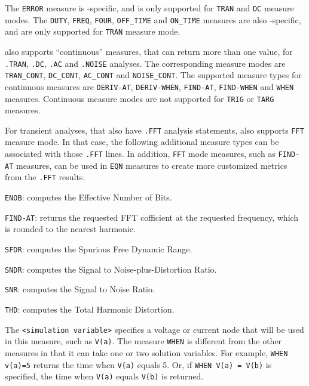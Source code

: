 The \texttt{ERROR} measure is \Xyce{}-specific, and is only supported for \texttt{TRAN} and
\texttt{DC} measure modes.  The \texttt{DUTY}, \texttt{FREQ}, \texttt{FOUR}, \texttt{OFF\_TIME}
and \texttt{ON\_TIME} measures are also \Xyce{}-specific, and are  only supported for
\texttt{TRAN} measure mode.

\Xyce{} also supports ``continuous'' measures, that can return more than one value, for
\texttt{.TRAN}, \texttt{.DC}, \texttt{.AC} and \texttt{.NOISE} analyses.  The
 corresponding measure modes are \texttt{TRAN\_CONT}, \texttt{DC\_CONT},
\texttt{AC\_CONT} and \texttt{NOISE\_CONT}.  The supported measure types for continuous
measures are \texttt{DERIV-AT}, \texttt{DERIV-WHEN}, \texttt{FIND-AT}, \texttt{FIND-WHEN}
and \texttt{WHEN} measures.  Continuous measure modes are not supported for \texttt{TRIG}
or \texttt{TARG} measures.

For transient analyses, that also have \texttt{.FFT} analysis statements, \Xyce{} also
supports \texttt{FFT} measure mode.  In that case, the following additional measure
types can be associated with those \texttt{.FFT} lines.  In addition, \texttt{FFT}
mode measures, such as \texttt{FIND-AT} measures, can be used in \texttt{EQN} measures
to create more customized metrics from the \texttt{.FFT} results.

\begin{XyceItemize}
  \item \texttt{ENOB}: computes the Effective Number of Bits.
  \item \texttt{FIND-AT}: returns the requested FFT cofficient at the
     requested frequency, which is rounded to the nearest harmonic.
  \item \texttt{SFDR}: computes the Spurious Free Dynamic Range.
  \item \texttt{SNDR}: computes the Signal to Noise-plus-Distortion Ratio.
  \item \texttt{SNR}: computes the Signal to Noise Ratio.
  \item \texttt{THD}: computes the Total Harmonic Distortion.
\end{XyceItemize}

The \texttt{<simulation variable>} specifies a voltage or current node that
will be used in this measure, such as \texttt{V(a)}.  The measure \texttt{WHEN}
is different from the other measures in that it can take one or two solution
variables. For example, \texttt{WHEN v(a)=5} returns the time when
\texttt{V(a)} equals 5.  Or, if \texttt{WHEN V(a) = V(b)} is specified, the
time when \texttt{V(a)} equals \texttt{V(b)} is returned.

